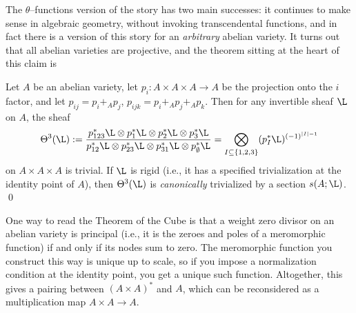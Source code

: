 The $\theta$--functions version of the story has two main successes: it continues to make sense in algebraic geometry, without invoking transcendental functions, and in fact there is a version of this story for an \emph{arbitrary} abelian variety.  It turns out that all abelian varieties are projective, and the theorem sitting at the heart of this claim is
\begin{corollary}\label{Theta3IsTrivial}
Let $A$ be an abelian variety, let $p_i: A \times A \times A \to A$ be the projection onto the $i${\th} factor, and let $p_{ij} = p_i +_A p_j$, $p_{ijk} = p_i +_A p_j +_A p_k$.  Then for any invertible sheaf $\L$ on $A$, the sheaf \[\Theta^3(\L) := \frac{p_{123}^* \L \otimes p_1^* \L \otimes p_2^* \L \otimes p_3^* \L}{p_{12}^* \L \otimes p_{23}^* \L \otimes p_{31}^* \L \otimes p_\emptyset^* \L} = \bigotimes_{I \subseteq \{1, 2, 3\}} (p_I^* \L)^{(-1)^{|I| - 1}}\] on $A \times A \times A$ is trivial.  If $\L$ is rigid (i.e., it has a specified trivialization at the identity point of $A$), then $\Theta^3(\L)$ is \emph{canonically} trivialized by a section $s(A; \L)$. \qed
\end{corollary}

\begin{remark}
One way to read the Theorem of the Cube is that a weight zero divisor on an abelian variety is principal (i.e., it is the zeroes and poles of a meromorphic function) if and only if its nodes sum to zero.  The meromorphic function you construct this way is unique up to scale, so if you impose a normalization condition at the identity point, you get a unique such function.  Altogether, this gives a pairing between $(A \times A)^*$ and $A$, which can be reconsidered as a multiplication map $A \times A \to A$.
\end{remark}

